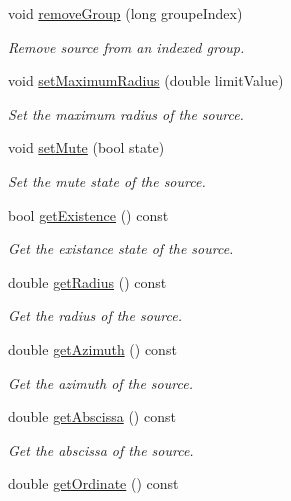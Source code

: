 \begin{DoxyCompactItemize}
void \hyperlink{class_hoa2_d_1_1_source_a9b1ae2dd03c552efc5df9554a4bbb75d}{remove\-Group} (long groupe\-Index)
\begin{DoxyCompactList}\small\item\em Remove source from an indexed group. \end{DoxyCompactList}\item 
void \hyperlink{class_hoa2_d_1_1_source_ac6e71e18e48a887d08f60f2ae3c63195}{set\-Maximum\-Radius} (double limit\-Value)
\begin{DoxyCompactList}\small\item\em Set the maximum radius of the source. \end{DoxyCompactList}\item 
void \hyperlink{class_hoa2_d_1_1_source_a343f4cef2eaf81e118d43883f05170d3}{set\-Mute} (bool state)
\begin{DoxyCompactList}\small\item\em Set the mute state of the source. \end{DoxyCompactList}\item 
bool \hyperlink{class_hoa2_d_1_1_source_aec13c7ac13d276b1635a7d8e8d3fa418}{get\-Existence} () const 
\begin{DoxyCompactList}\small\item\em Get the existance state of the source. \end{DoxyCompactList}\item 
double \hyperlink{class_hoa2_d_1_1_source_aa1ca86804bc72602d4e3d332df912452}{get\-Radius} () const 
\begin{DoxyCompactList}\small\item\em Get the radius of the source. \end{DoxyCompactList}\item 
double \hyperlink{class_hoa2_d_1_1_source_aec1cb1c94d9e0eda417fff2f4baf9567}{get\-Azimuth} () const 
\begin{DoxyCompactList}\small\item\em Get the azimuth of the source. \end{DoxyCompactList}\item 
double \hyperlink{class_hoa2_d_1_1_source_a31246db09e0e569d7c3e9d49283ccfad}{get\-Abscissa} () const 
\begin{DoxyCompactList}\small\item\em Get the abscissa of the source. \end{DoxyCompactList}\item 
double \hyperlink{class_hoa2_d_1_1_source_a4ecf39dab7526d842e894662c439b188}{get\-Ordinate} () const 

\end{DoxyCompactItemize}
